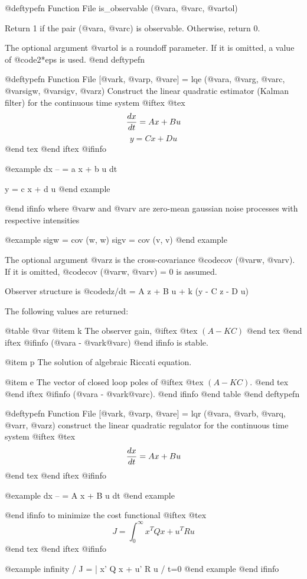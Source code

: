 @deftypefn {Function File} {} is_observable (@var{a}, @var{c}, @var{tol})

Return 1 if the pair (@var{a}, @var{c}) is observable.
Otherwise, return 0.

The optional argument @var{tol} is a roundoff parameter.  If it is
omitted, a value of @code{2*eps} is used.
@end deftypefn

@deftypefn {Function File} {[@var{k}, @var{p}, @var{e}] =} lqe (@var{a}, @var{g}, @var{c}, @var{sigw}, @var{sigv}, @var{z})
Construct the linear quadratic estimator (Kalman filter) for the
continuous time system
@iftex
@tex
$$
 {dx\over dt} = A x + B u
$$
$$
 y = C x + D u
$$
@end tex
@end iftex
@ifinfo

@example
dx
-- = a x + b u
dt

y = c x + d u
@end example

@end ifinfo
where @var{w} and @var{v} are zero-mean gaussian noise processes with
respective intensities

@example
sigw = cov (w, w)
sigv = cov (v, v)
@end example

The optional argument @var{z} is the cross-covariance
@code{cov (@var{w}, @var{v})}.  If it is omitted,
@code{cov (@var{w}, @var{v}) = 0} is assumed.

Observer structure is @code{dz/dt = A z + B u + k (y - C z - D u)}

The following values are returned:

@table @var
@item k
The observer gain,
@iftex
@tex
$(A - K C)$
@end tex
@end iftex
@ifinfo
(@var{a} - @var{k}@var{c})
@end ifinfo
is stable.

@item p
The solution of algebraic Riccati equation.

@item e
The vector of closed loop poles of
@iftex
@tex
$(A - K C)$.
@end tex
@end iftex
@ifinfo
(@var{a} - @var{k}@var{c}).
@end ifinfo
@end table
@end deftypefn

@deftypefn {Function File} {[@var{k}, @var{p}, @var{e}] =} lqr (@var{a}, @var{b}, @var{q}, @var{r}, @var{z})
construct the linear quadratic regulator for the continuous time system
@iftex
@tex
$$
 {dx\over dt} = A x + B u
$$
@end tex
@end iftex
@ifinfo

@example
dx
-- = A x + B u
dt
@end example

@end ifinfo
to minimize the cost functional
@iftex
@tex
$$
 J = \int_0^\infty x^T Q x + u^T R u
$$
@end tex
@end iftex
@ifinfo

@example
      infinity
      /
  J = |  x' Q x + u' R u
     /
    t=0
@end example
@end ifinfo

